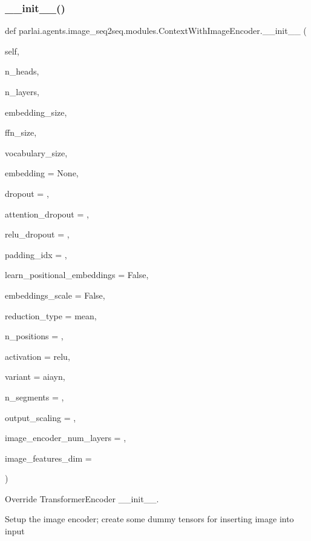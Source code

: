 \subsubsection{\texorpdfstring{\+\_\+\+\_\+init\+\_\+\+\_\+()}{\_\_init\_\_()}}
{\footnotesize\ttfamily def parlai.\+agents.\+image\+\_\+seq2seq.\+modules.\+Context\+With\+Image\+Encoder.\+\_\+\+\_\+init\+\_\+\+\_\+ (\begin{DoxyParamCaption}\item[{}]{self,  }\item[{}]{n\+\_\+heads,  }\item[{}]{n\+\_\+layers,  }\item[{}]{embedding\+\_\+size,  }\item[{}]{ffn\+\_\+size,  }\item[{}]{vocabulary\+\_\+size,  }\item[{}]{embedding = {\ttfamily None},  }\item[{}]{dropout = {},  }\item[{}]{attention\+\_\+dropout = {},  }\item[{}]{relu\+\_\+dropout = {},  }\item[{}]{padding\+\_\+idx = {},  }\item[{}]{learn\+\_\+positional\+\_\+embeddings = {\ttfamily False},  }\item[{}]{embeddings\+\_\+scale = {\ttfamily False},  }\item[{}]{reduction\+\_\+type = {\ttfamily \textquotesingle{}mean\textquotesingle{}},  }\item[{}]{n\+\_\+positions = {},  }\item[{}]{activation = {\ttfamily \textquotesingle{}relu\textquotesingle{}},  }\item[{}]{variant = {\ttfamily \textquotesingle{}aiayn\textquotesingle{}},  }\item[{}]{n\+\_\+segments = {},  }\item[{}]{output\+\_\+scaling = {},  }\item[{}]{image\+\_\+encoder\+\_\+num\+\_\+layers = {},  }\item[{}]{image\+\_\+features\+\_\+dim = {} }\end{DoxyParamCaption})}

\begin{DoxyVerb}Override TransformerEncoder __init__.

Setup the image encoder; create some dummy tensors for inserting image into
input
\end{DoxyVerb}
 

